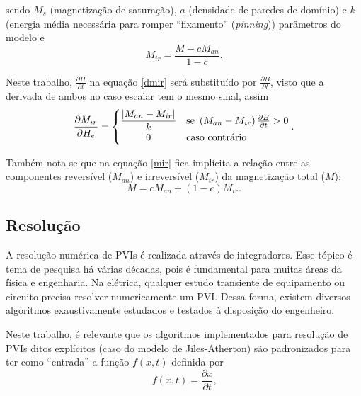 \documentclass{homeworg}
\begin{document}
sendo $M_s$ (magnetização de saturação), $a$ (densidade de paredes de domínio) e $k$ (energia média necessária para romper ``fixamento'' (\textit{pinning})) parâmetros do modelo e
\begin{equation} \label{mir}
  M_{ir} = \frac{M - c M_{an}}{1-c} \text{.}
\end{equation}

\hspace{1cm} Neste trabalho, $\frac{\partial H}{\partial t}$ na equação \ref{dmir} será substituído por $\frac{\partial B}{\partial t}$, visto que a derivada de ambos no caso escalar tem o mesmo sinal, assim
\begin{equation}
  \frac{\partial M_{ir}}{\partial H_e} = \begin{cases}
    \displaystyle \frac{\lvert M_{an} - M_{ir} \rvert}{k} & \text{se } \left(M_{an} - M_{ir}\right) \frac{\partial B}{\partial t} > 0 \\
    \displaystyle\hfil 0 & \text{caso contrário}
  \end{cases} \text{.}
\end{equation}

\hspace{1cm} Também nota-se que na equação \ref{mir} fica implícita a relação entre as componentes reversível ($M_{an}$) e irreversível ($M_{ir}$) da magnetização total ($M$):
\begin{equation}
  M = c M_{an} + (1-c) M_{ir}\text{.}
\end{equation}

\subsection{Resolução}

\hspace{1cm} A resolução numérica de PVIs é realizada através de integradores. Esse tópico é tema de pesquisa há várias décadas, pois é fundamental para muitas áreas da física e engenharia. Na elétrica, qualquer estudo transiente de equipamento ou circuito precisa resolver numericamente um PVI. Dessa forma, existem diversos algoritmos exaustivamente estudados e testados à disposição do engenheiro.

\hspace{1cm} Neste trabalho, é relevante que os algoritmos implementados para resolução de PVIs ditos explícitos (caso do modelo de Jiles-Atherton) são padronizados para ter como ``entrada'' a função $f(x, t)$ definida por
\begin{equation} \label{pvi}
  f(x, t) = \frac{\partial x}{\partial t} \text{,}
\end{equation}
\end{document}

